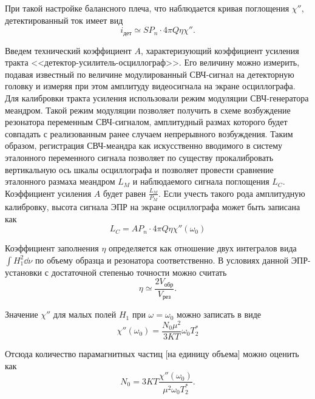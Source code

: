 \documentclass[a4paper,14pt]{extarticle}
\begin{document}
При такой настройке балансного плеча, что наблюдается кривая поглощения $\chi''$, детектированный ток имеет вид \cite[стр. 33]{mar}
\begin{equation}
    \label{eq:15}
    i_{\text{дет}} \simeq S P_n \cdot 4 \pi Q \eta \chi''.
\end{equation}

Введем технический коэффициент $A$, характеризующий коэффициент усиления тракта <<детектор-усилитель-осциллограф>>. Его величину можно измерить, подавая известный по величине модулированный СВЧ-сигнал на детекторную головку и измеряя при этом амплитуду видеосигнала на экране осциллографа. Для калибровки тракта усиления использовали режим модуляции СВЧ-генератора меандром. Такой режим модуляции позволяет получить в схеме возбуждение резонатора переменным СВЧ-сигналом, амплитудный размах которого будет совпадать с реализованным ранее случаем непрерывного возбуждения. Таким образом, регистрация СВЧ-меандра как искусственно вводимого в систему эталонного переменного сигнала позволяет по существу прокалибровать вертикальную ось шкалы осциллографа и позволяет провести сравнение эталонного размаха меандром $L_M$ и наблюдаемого сигнала поглощения $L_C$. Коэффициент усиления $A$ будет равен  $\frac{L_M}{P_M}$. Если учесть такого рода амплитудную калибровку, высота сигнала ЭПР на экране осциллографа может быть записана как
\begin{equation}
    \label{eq:16}
    L_{C} = A P_n \cdot 4 \pi Q \eta \chi''(\omega_{0})
\end{equation}

Коэффициент заполнения $\eta$ определяется как отношение  двух интегралов вида  $\int H_{1}^2 \dd{\nu}$ по объему образца и резонатора соответственно. В условиях данной ЭПР-установки
с достаточной степенью точности можно считать 
\begin{equation}
    \label{eq:17}
    \eta \simeq \frac{2 V_{\text{обр}}}{V_{\text{рез}}}.
\end{equation}

Значение $\chi''$ для малых полей  $H_{1}$ при $\omega = \omega_{0}$ можно записать в виде
\begin{equation}
    \label{eq:18}
    \chi '' (\omega_{0}) = \frac{N_{0} \mu^2}{3KT} \omega_{0} T_2^*
\end{equation}

Отсюда количество парамагнитных частиц [на единицу объема] можно оценить как
\begin{equation}
    \label{eq:20}
    N_0 = 3KT \frac{\chi''(\omega_{0})}{\mu^2 \omega_0 T_2^*}.
\end{equation}
\end{document}
